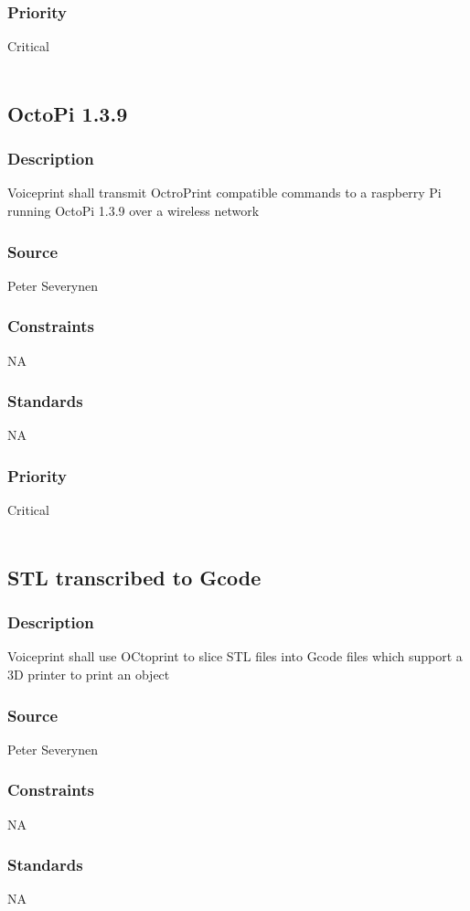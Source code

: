 \subsubsection{Priority}
Critical \\
\\
\subsection{OctoPi 1.3.9}
\subsubsection{Description}
Voiceprint shall transmit OctroPrint compatible commands to a raspberry Pi running OctoPi 1.3.9 over a wireless network
\subsubsection{Source}
Peter Severynen
\subsubsection{Constraints}
NA
\subsubsection{Standards}
NA
\subsubsection{Priority}
Critical \\
\\
\subsection{STL transcribed to Gcode}
\subsubsection{Description}
Voiceprint shall use OCtoprint to slice STL files into Gcode files which support a 3D printer to print an object
\subsubsection{Source}
Peter Severynen
\subsubsection{Constraints}
NA
\subsubsection{Standards}
NA
